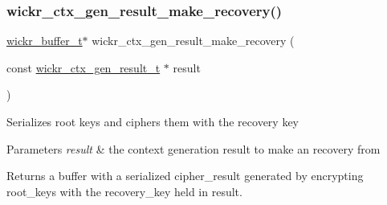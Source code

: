 \subsubsection{\texorpdfstring{wickr\+\_\+ctx\+\_\+gen\+\_\+result\+\_\+make\+\_\+recovery()}{wickr\_ctx\_gen\_result\_make\_recovery()}}
{\footnotesize\ttfamily \mbox{\hyperlink{structwickr__buffer}{wickr\+\_\+buffer\+\_\+t}}$\ast$ wickr\+\_\+ctx\+\_\+gen\+\_\+result\+\_\+make\+\_\+recovery (\begin{DoxyParamCaption}\item[{const \mbox{\hyperlink{structwickr__ctx__gen__result}{wickr\+\_\+ctx\+\_\+gen\+\_\+result\+\_\+t}} $\ast$}]{result }\end{DoxyParamCaption})}

Serializes root keys and ciphers them with the recovery key


\begin{DoxyParams}{Parameters}
{\em result} & the context generation result to make an recovery from \\
\hline
\end{DoxyParams}
\begin{DoxyReturn}{Returns}
a buffer with a serialized cipher\+\_\+result generated by encrypting \textquotesingle{}root\+\_\+keys\textquotesingle{} with the \textquotesingle{}recovery\+\_\+key\textquotesingle{} held in \textquotesingle{}result\textquotesingle{}. 
\end{DoxyReturn}
\mbox{\label{group__wickr__ctx_gaab0b2731d76d6ea91afd1b147c53a29a}} 

